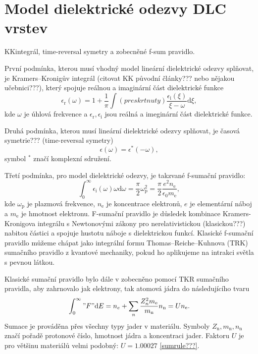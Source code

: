 \chapter{Model dielektrické odezvy DLC vrstev}


KKintegrál, time-reversal symetry a zobecněné f-sum pravidlo.

První podmínka, kterou musí vhodný model lineární dielektrické odezvy splňovat, je Kramers--Kronigův integrál (citovat KK původní články??? nebo nějakou učebnici???), který spojuje reálnou a imaginární část dielektrické funkce  
\begin{equation}
\epsilon_\mathrm{r}(\omega) = 1 + \frac{1}{\pi} \int (preskrtnuty) \frac{\epsilon_\mathrm{i}(\xi)}{\xi - \omega} \mathrm{d}\xi \mathrm{,}
\label{KKint}
\end{equation}
kde $\omega$ je úhlová frekvence a $\epsilon_\mathrm{r}, \epsilon_\mathrm{i}$ jsou reálná a imeginární část dielektrické funkce.  

Druhá podmínka, kterou musí lineární dielektrické odezvy splňovat, je časová symetrie??? (time-reversal symetry)
\begin{equation}
\epsilon(\omega) =\epsilon^* (-\omega) \mathrm{,}
\label{casovasymetrie}
\end{equation}
symbol $^*$ značí komplexní sdružení.

Třetí podmínka, pro model dielektrické odezvy, je takzvané f-sumační pravidlo:
\begin{equation}
\int_0^\infty \epsilon_\mathrm{i} (\omega) \omega \mathrm{d} \omega = \frac{\pi}{2} \omega_\mathrm{p}^2 = \frac{\pi}{2} \frac{e^2 n_\mathrm{e}}{ \epsilon_0 m_\mathrm{e}} \mathrm{,}
\end{equation}
kde $\omega_\mathrm{p}$ je plazmová frekvence, $n_\mathrm{e}$ je koncentrace elektronů, $e$ je elementární náboj a $m_\mathrm{e}$ je hmotnost elektronu. F-sumační pravidlo je důsledek kombinace Kramers-Kronigova integrálu s Newtonovými zákony pro nerelativistickou (klasickou???) nabitou částici a spojuje hustotu náboje s dielektrickou funkcí. Klasické f-sumační pravidlo můžeme chápat jako integrální formu Thomas--Reiche--Kuhnova (TRK) sumačního pravidlo z kvantové mechaniky, pokud ho aplikujeme na intrakci světla s pevnou látkou.  

Klasické sumační pravidlo bylo dále v \cite{sumrule} zobecněno pomocí TKR sumačního pravidla, aby zahrnovalo jak elektrony, tak atomová jádra do následujícího tvaru
\begin{equation}
\int_0^\infty "F" \mathrm{d}E = n_e + \sum_n \frac{Z_n^2 m_\mathrm{e}} {m_\mathrm{n}} n_\mathrm{n} = U n_\mathrm{e} \mathrm{.} %
\end{equation}
Sumace je prováděna přes všechny typy jader v materiálu. Symboly $Z_\mathrm{n}, m_\mathrm{n}, n_\mathrm{n}$ značí pořadě protonové číslo, hmotnost jádra a koncentraci jader. Faktoru $U$ je pro většinu materiálů velmi podobný: $U = 1.00027$ \ref{sumrule???}.

